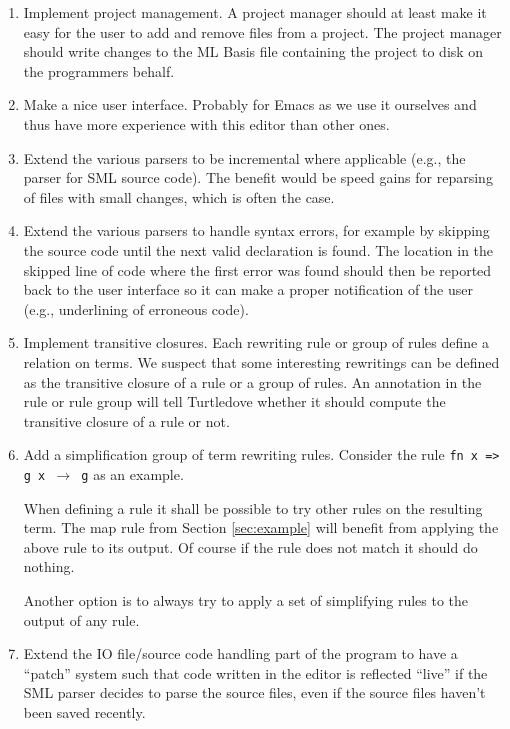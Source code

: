 \documentclass[a4paper,oneside,final]{article}
\begin{document}
\begin{enumerate}

\item Implement project management. A project manager should at least make it
  easy for the user to add and remove files from a project. The project manager
  should write changes to the ML Basis file containing the project to disk on
  the programmers behalf.

\item Make a nice user interface. Probably for Emacs as we use it ourselves and
  thus have more experience with this editor than other ones.

\item Extend the various parsers to be incremental where applicable (e.g., the
  parser for SML source code). The benefit would be speed gains for reparsing of
  files with small changes, which is often the case.

\item Extend the various parsers to handle syntax errors, for example by
  skipping the source code until the next valid declaration is found. The
  location in the skipped line of code where the first error was found should
  then be reported back to the user interface so it can make a proper
  notification of the user (e.g., underlining of erroneous code).


\item Implement transitive closures. Each rewriting rule or group of rules
  define a relation on terms. We suspect that some interesting rewritings can be
  defined as the transitive closure of a rule or a group of rules. An annotation
  in the rule or rule group will tell Turtledove whether it should compute the
  transitive closure of a rule or not.

\item Add a simplification group of term rewriting rules. Consider the rule
  \texttt{fn x => g x $\rightarrow$ g} as an example.

  When defining a rule it shall be possible to try other rules on the resulting
  term. The map rule from Section \ref{sec:example} will benefit from applying
  the above rule to its output. Of course if the rule does not match it should
  do nothing.

  Another option is to always try to apply a set of simplifying rules to the
  output of any rule.

\item Extend the IO file/source code handling part of the program to have a
  ``patch'' system such that code written in the editor is reflected ``live'' if
  the SML parser decides to parse the source files, even if the source files
  haven't been saved recently.


\end{enumerate}
\end{document}

